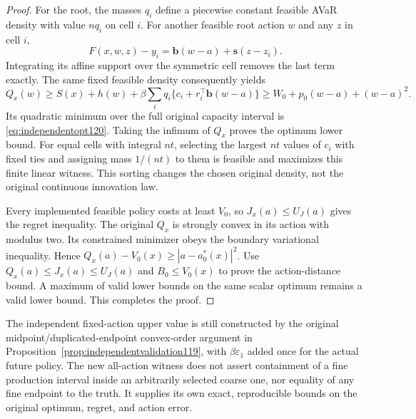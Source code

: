 \begin{proof}
For the root, the masses $q_i$ define a piecewise constant
feasible AVaR density with value $nq_i$ on cell $i$.
For another feasible root action $w$ and any $z$ in cell $i$,
\[
 F(x,w,z)-y_i=\boldsymbol b(w-a)+\boldsymbol s(z-z_i).
\]
Integrating its affine support over the symmetric cell
removes the last term exactly.  The same fixed feasible
density consequently yields
\[
 Q_x(w)\ge
 S(x)+h(w)+\beta\sum_iq_i
                 \{c_i+r_i^\top\boldsymbol b(w-a)\}
 \ge W_0+p_0(w-a)+(w-a)^2 .
\]
Its quadratic minimum over the full original capacity
interval is \eqref{eq:independentopt120}.
Taking the infimum of $Q_x$ proves the optimum lower bound.
For equal cells with integral $nt$, selecting the largest
$nt$ values of $c_i$ with fixed ties and assigning mass
$1/(nt)$ to them is feasible and maximizes this finite
linear witness.  This sorting changes the chosen original
density, not the original continuous innovation law.

Every implemented feasible policy costs at least $V_0$,
so $J_x(a)\le U_J(a)$ gives the regret inequality.
The original $Q_x$ is strongly convex in its action with
modulus two.  Its constrained minimizer obeys the boundary
variational inequality.  Hence
$Q_x(a)-V_0(x)\ge|a-a_0^*(x)|^2$.
Use $Q_x(a)\le J_x(a)\le U_J(a)$ and $B_0\le V_0(x)$
to prove the action-distance bound.  A maximum of valid
lower bounds on the same scalar optimum remains a valid
lower bound.  This completes the proof.
\end{proof}

The independent fixed-action upper value is still constructed by
the original midpoint/duplicated-endpoint convex-order argument
in Proposition~\ref{prop:independentvalidation119}, with
$\beta\varepsilon_1$ added once for the actual future policy.
The new all-action witness does not assert containment of a
fine production interval inside an arbitrarily selected coarse
one, nor equality of any fine endpoint to the truth.  It supplies
its own exact, reproducible bounds on the original optimum,
regret, and action error.

